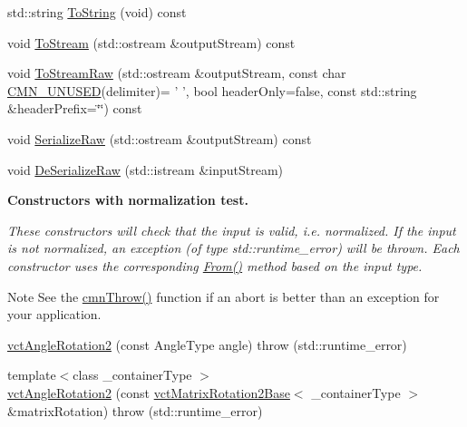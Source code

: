 \begin{DoxyCompactItemize}
std\-::string \hyperlink{classvct_angle_rotation2_a8b9dfa85894a2db5a16bca82e84722b3}{To\-String} (void) const 
\item 
void \hyperlink{classvct_angle_rotation2_a413c2f8d65112ff7e8382c605c20a37a}{To\-Stream} (std\-::ostream \&output\-Stream) const 
\item 
void \hyperlink{classvct_angle_rotation2_a4990b0ad346f5186f7ba4bb5342ab9f1}{To\-Stream\-Raw} (std\-::ostream \&output\-Stream, const char \hyperlink{cmn_portability_8h_a021894e2626935fa2305434b1e893ff6}{C\-M\-N\-\_\-\-U\-N\-U\-S\-E\-D}(delimiter)= ' ', bool header\-Only=false, const std\-::string \&header\-Prefix=\char`\"{}\char`\"{}) const 
\item 
void \hyperlink{classvct_angle_rotation2_ad097953f97ed6c015bcc97c7aff99d11}{Serialize\-Raw} (std\-::ostream \&output\-Stream) const 
\item 
void \hyperlink{classvct_angle_rotation2_acf9bfa185dd8d9dd5d68899b904226fa}{De\-Serialize\-Raw} (std\-::istream \&input\-Stream)
\end{DoxyCompactItemize}
\begin{Indent}{\bf Constructors with normalization test.}\par
{\em These constructors will check that the input is valid, i.\-e. normalized. If the input is not normalized, an exception (of type {\ttfamily std\-::runtime\-\_\-error}) will be thrown. Each constructor uses the corresponding \hyperlink{classvct_angle_rotation2_a831a44a42d74add50de6b0cf38c13087}{From()} method based on the input type.

\begin{DoxyNote}{Note}
See the \hyperlink{_minimal_cmn_8h_ad50e82cf9c9dbd0e6443c13e0d1a6f1a}{cmn\-Throw()} function if an {\ttfamily abort} is better than an exception for your application. 
\end{DoxyNote}
}\begin{DoxyCompactItemize}
\item 
\hyperlink{classvct_angle_rotation2_a284d8017b3adff23a4316bffcdad421d}{vct\-Angle\-Rotation2} (const Angle\-Type angle)  throw (std\-::runtime\-\_\-error)
\item 
{\footnotesize template$<$class \-\_\-container\-Type $>$ }\\\hyperlink{classvct_angle_rotation2_a5e703c6c83197f5079d246f4c802ee7b}{vct\-Angle\-Rotation2} (const \hyperlink{classvct_matrix_rotation2_base}{vct\-Matrix\-Rotation2\-Base}$<$ \-\_\-container\-Type $>$ \&matrix\-Rotation)  throw (std\-::runtime\-\_\-error)
\end{DoxyCompactItemize}
\end{Indent}
